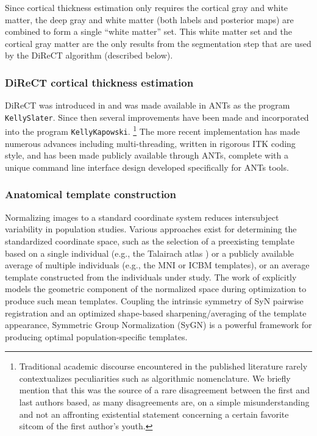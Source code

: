 Since cortical thickness estimation only requires the cortical gray
and white matter, the deep gray and white matter
(both labels and posterior maps) are combined to form a single
``white matter'' set.  This white matter set and the cortical
gray matter are the only results from the segmentation
step that are used by the DiReCT algorithm (described below).


\subsubsection{DiReCT cortical thickness estimation}

DiReCT was introduced 
in \cite{das2009} and was made available in ANTs as the program \verb#KellySlater#.
Since then several improvements have been made and incorporated into the program
\verb#KellyKapowski#.%
\footnote{
Traditional academic discourse encountered in the published literature
rarely contextualizes peculiarities such as algorithmic nomenclature.
We briefly mention that
this was the source of a rare disagreement between the first and last authors
based, as many disagreements are, on a simple misunderstanding and not an
affronting existential statement concerning a certain favorite sitcom
of the first author's youth. 
}
The more recent implementation has made numerous advances including
multi-threading, written in rigorous ITK coding style,%
 and
has been made publicly available through ANTs, complete with a unique command line
interface design developed specifically for ANTs tools.

\subsubsection{Anatomical template construction}

Normalizing images to a standard coordinate system
reduces intersubject variability in population studies.  Various
approaches exist for determining the standardized coordinate space,
such as the selection of a preexisting template based on a single individual
(e.g., the Talairach atlas \citep{Talairach1988}) or a publicly available average of multiple individuals
(e.g., the MNI \citep{Collins1994} or ICBM \citep{Mazziotta1995}
templates), or an average template constructed from the individuals under study.
The work of \cite{avants2010} explicitly models the geometric component of the 
normalized space during optimization to produce such mean templates.  Coupling the intrinsic symmetry of 
SyN pairwise registration \citep{avants2011} and an
optimized shape-based sharpening/averaging of the template appearance, Symmetric Group Normalization (SyGN) is a powerful framework for producing optimal population-specific templates.

